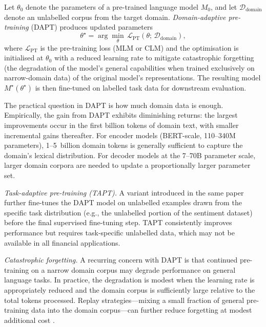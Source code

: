 \begin{definition}
\label{def:ch08-dapt}
Let $\theta_0$ denote the parameters of a pre-trained language model $M_0$, and
let $\mathcal{D}_\mathrm{domain}$ denote an unlabelled corpus from the target domain.
\emph{Domain-adaptive pre-training} (DAPT) produces updated parameters
\begin{equation}
  \theta^\star = \arg\min_\theta \, \mathcal{L}_\mathrm{PT}(\theta;\, \mathcal{D}_\mathrm{domain}),
  \label{eq:ch08-dapt}
\end{equation}
where $\mathcal{L}_\mathrm{PT}$ is the pre-training loss (MLM or CLM) and the
optimisation is initialised at $\theta_0$ with a reduced learning rate to
mitigate catastrophic forgetting (the degradation of the model's general capabilities when trained exclusively on narrow-domain data) of the original model's representations.
The resulting model $M^\star(\theta^\star)$ is then fine-tuned on labelled task
data for downstream evaluation.
\end{definition}

The practical question in DAPT is how much domain data is enough.  Empirically,
the gain from DAPT exhibits diminishing returns: the largest improvements occur
in the first billion tokens of domain text, with smaller incremental gains
thereafter.  For encoder models (BERT-scale, 110--340M parameters),
1--5~billion domain tokens is generally sufficient to capture the domain's lexical
distribution.  For decoder models at the 7--70B parameter scale, larger domain
corpora are needed to update a proportionally larger parameter set.

\textit{Task-adaptive pre-training (TAPT).}  A variant introduced in the same
paper \cite{gururangan2020dont} further fine-tunes the DAPT model on unlabelled
examples drawn from the specific task distribution (e.g., the unlabelled portion
of the sentiment dataset) before the final supervised fine-tuning step.  TAPT
consistently improves performance but requires task-specific unlabelled data,
which may not be available in all financial applications.

\textit{Catastrophic forgetting.}  A recurring concern with DAPT is that
continued pre-training on a narrow domain corpus may degrade performance on
general language tasks.  In practice, the degradation is modest when the
learning rate is appropriately reduced and the domain corpus is sufficiently
large relative to the total tokens processed.  Replay strategies---mixing a
small fraction of general pre-training data into the domain corpus---can further
reduce forgetting at modest additional cost \cite{gururangan2020dont}.


